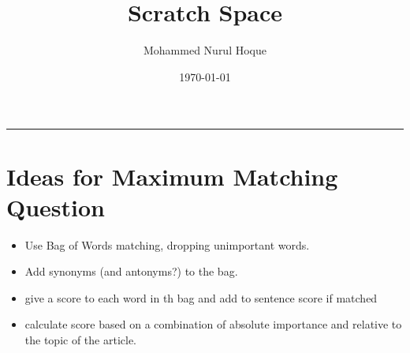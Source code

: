 \documentclass{article}
\title{Scratch Space}
\author{Mohammed Nurul Hoque}
\date{\today}
\begin{document}
    \maketitle
    \hrule\relax
    \section*{Ideas for Maximum Matching Question}
    \begin{itemize}
        \item Use Bag of Words matching, dropping unimportant words.
        \item Add synonyms (and antonyms?) to the bag.
        \item give a score to each word in th bag and add to sentence score if matched
        \item calculate score based on a combination of absolute importance and relative to the
            topic of the article.
    \end{itemize}
    

    
\end{document}
